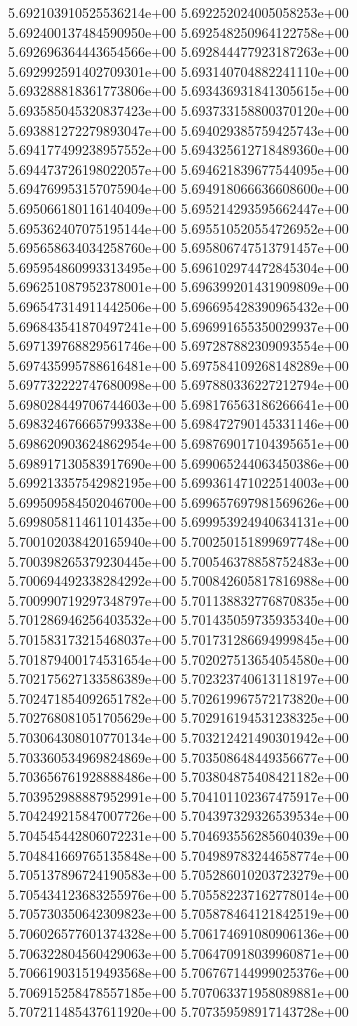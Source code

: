5.692103910525536214e+00
5.692252024005058253e+00
5.692400137484590950e+00
5.692548250964122758e+00
5.692696364443654566e+00
5.692844477923187263e+00
5.692992591402709301e+00
5.693140704882241110e+00
5.693288818361773806e+00
5.693436931841305615e+00
5.693585045320837423e+00
5.693733158800370120e+00
5.693881272279893047e+00
5.694029385759425743e+00
5.694177499238957552e+00
5.694325612718489360e+00
5.694473726198022057e+00
5.694621839677544095e+00
5.694769953157075904e+00
5.694918066636608600e+00
5.695066180116140409e+00
5.695214293595662447e+00
5.695362407075195144e+00
5.695510520554726952e+00
5.695658634034258760e+00
5.695806747513791457e+00
5.695954860993313495e+00
5.696102974472845304e+00
5.696251087952378001e+00
5.696399201431909809e+00
5.696547314911442506e+00
5.696695428390965432e+00
5.696843541870497241e+00
5.696991655350029937e+00
5.697139768829561746e+00
5.697287882309093554e+00
5.697435995788616481e+00
5.697584109268148289e+00
5.697732222747680098e+00
5.697880336227212794e+00
5.698028449706744603e+00
5.698176563186266641e+00
5.698324676665799338e+00
5.698472790145331146e+00
5.698620903624862954e+00
5.698769017104395651e+00
5.698917130583917690e+00
5.699065244063450386e+00
5.699213357542982195e+00
5.699361471022514003e+00
5.699509584502046700e+00
5.699657697981569626e+00
5.699805811461101435e+00
5.699953924940634131e+00
5.700102038420165940e+00
5.700250151899697748e+00
5.700398265379230445e+00
5.700546378858752483e+00
5.700694492338284292e+00
5.700842605817816988e+00
5.700990719297348797e+00
5.701138832776870835e+00
5.701286946256403532e+00
5.701435059735935340e+00
5.701583173215468037e+00
5.701731286694999845e+00
5.701879400174531654e+00
5.702027513654054580e+00
5.702175627133586389e+00
5.702323740613118197e+00
5.702471854092651782e+00
5.702619967572173820e+00
5.702768081051705629e+00
5.702916194531238325e+00
5.703064308010770134e+00
5.703212421490301942e+00
5.703360534969824869e+00
5.703508648449356677e+00
5.703656761928888486e+00
5.703804875408421182e+00
5.703952988887952991e+00
5.704101102367475917e+00
5.704249215847007726e+00
5.704397329326539534e+00
5.704545442806072231e+00
5.704693556285604039e+00
5.704841669765135848e+00
5.704989783244658774e+00
5.705137896724190583e+00
5.705286010203723279e+00
5.705434123683255976e+00
5.705582237162778014e+00
5.705730350642309823e+00
5.705878464121842519e+00
5.706026577601374328e+00
5.706174691080906136e+00
5.706322804560429063e+00
5.706470918039960871e+00
5.706619031519493568e+00
5.706767144999025376e+00
5.706915258478557185e+00
5.707063371958089881e+00
5.707211485437611920e+00
5.707359598917143728e+00
